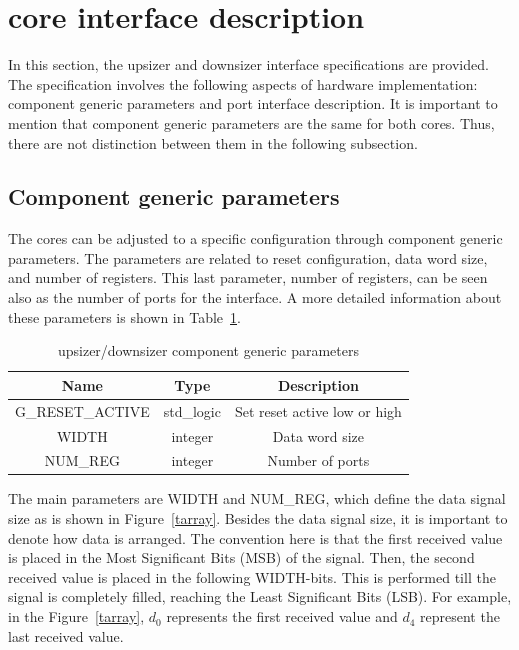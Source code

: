 \documentclass[10pt, conference, compsocconf]{IEEEtran}
\begin{document}
\section{core interface description}

In this section, the upsizer and downsizer interface specifications are provided. The specification involves the following aspects of hardware implementation: component generic parameters and port interface description. It is important to mention that component generic parameters are the same for both cores. Thus, there are not
distinction between them in the following subsection.

\subsection{Component generic parameters}

The cores can be adjusted to a specific configuration through component generic parameters. The parameters are related to reset configuration, data word size, and number of registers. This last parameter, number of registers, can be seen also as the number of ports for the interface. A more detailed information about these parameters is shown in Table~\ref{generics}.

\begin{table}[!t]
	\caption{upsizer/downsizer component generic parameters}
	\label{generics}
	\centering
	\begin{tabular}{|c|c|c|}
\hline
Name & Type & Description \\ \hline \hline
G\_RESET\_ACTIVE & std\_logic & Set reset active low or high \\ \hline
WIDTH & integer & Data word size \\ \hline
NUM\_REG & integer & Number of ports \\ \hline
	\end{tabular}
\end{table}

The main parameters are WIDTH and NUM\_REG, which define the data signal size as is shown in Figure~\ref{tarray}. Besides the data signal size, it is important to denote how data is arranged.
The convention here is that the first received value is placed in the Most Significant Bits (MSB) of the signal. Then, the second received value is placed in the following WIDTH-bits. This is performed till the signal is completely filled, reaching the Least Significant Bits (LSB). For example, in the Figure~\ref{tarray}, $d_0$ represents the first received value and $d_4$ represent the last received value.
\end{document}
